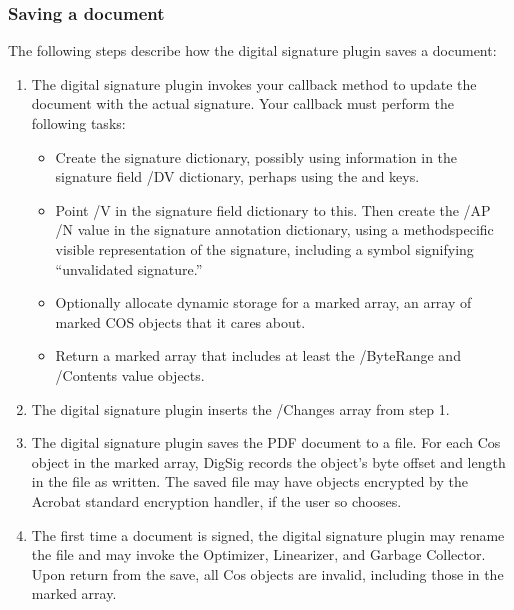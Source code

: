 \documentclass[letterpaper,12pt,english,openany,oneside]{sphinxmanual}
\begin{document}
\subsubsection{Saving a document}
\label{\detokenize{Plugins_ExtendedAPI:saving-a-document}}
The following steps describe how the digital signature plugin saves a document:
\begin{enumerate}
%
\item {} 
The digital signature plugin invokes your  callback method to update the document with the actual signature. Your  callback must perform the following tasks:
\begin{itemize}
\item {} 
Create the signature dictionary, possibly using information in the signature field /DV dictionary, perhaps using the  and  keys.

\item {} 
Point /V in the signature field dictionary to this. Then create the /AP /N value in the signature annotation dictionary, using a method\sphinxhyphen{}specific visible representation of the signature, including a symbol signifying “unvalidated signature.”

\item {} 
Optionally allocate dynamic storage for a marked array, an array of marked COS objects that it cares about.

\item {} 
Return a marked array that includes at least the /ByteRange and /Contents value objects.

\end{itemize}

\item {} 
The digital signature plugin inserts the /Changes array from step 1.

\item {} 
The digital signature plugin saves the PDF document to a file. For each Cos object in the marked array, DigSig records the object’s byte offset and length in the file as written. The saved file may have objects encrypted by the Acrobat standard encryption handler, if the user so chooses.

\item {} 
The first time a document is signed, the digital signature plugin may rename the file and may invoke the Optimizer, Linearizer, and Garbage Collector. Upon return from the save, all Cos objects are invalid, including those in the marked array.

\end{enumerate}
\end{document}
